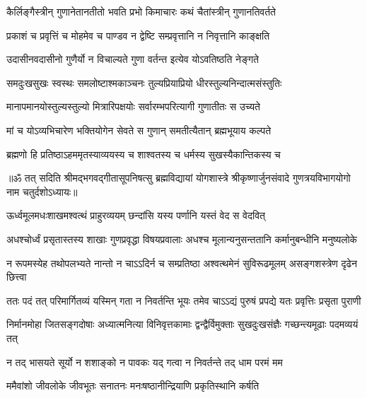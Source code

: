 
\twolineshloka
{कैर्लिङ्गैस्त्रीन् गुणानेतानतीतो भवति प्रभो}
{किमाचारः कथं चैतांस्त्रीन् गुणानतिवर्तते}%


\twolineshloka
{प्रकाशं च प्रवृत्तिं च मोहमेव च पाण्डव}
{न द्वेष्टि सम्प्रवृत्तानि न निवृत्तानि काङ्क्षति}%

\twolineshloka
{उदासीनवदासीनो गुणैर्यो न विचाल्यते}
{गुणा वर्तन्त इत्येव योऽवतिष्ठति नेङ्गते}%

\twolineshloka
{समदुःखसुखः स्वस्थः समलोष्टाश्मकाञ्चनः}
{तुल्यप्रियाप्रियो धीरस्तुल्यनिन्दात्मसंस्तुतिः}%

\twolineshloka
{मानापमानयोस्तुल्यस्तुल्यो मित्रारिपक्षयोः}
{सर्वारम्भपरित्यागी गुणातीतः स उच्यते}%

\twolineshloka
{मां च योऽव्यभिचारेण भक्तियोगेन सेवते}
{स गुणान् समतीत्यैतान् ब्रह्मभूयाय कल्पते}%

\twolineshloka
{ब्रह्मणो हि प्रतिष्ठाऽहममृतस्याव्ययस्य च}
{शाश्वतस्य च धर्मस्य सुखस्यैकान्तिकस्य च}%

{॥ॐ तत् सदिति श्रीमद्भगवद्गीतासूपनिषत्सु ब्रह्मविद्यायां योगशास्त्रे श्रीकृष्णार्जुनसंवादे गुणत्रयविभागयोगो नाम चतुर्दशोऽध्यायः॥}



\twolineshloka
{ऊर्ध्वमूलमधःशाखमश्वत्थं प्राहुरव्ययम्}
{छन्दांसि यस्य पर्णानि यस्तं वेद स वेदवित्}%

\fourlineindentedshloka
{अधश्चोर्ध्वं प्रसृतास्तस्य शाखाः}
{गुणप्रवृद्धा विषयप्रवालाः}
{अधश्च मूलान्यनुसन्ततानि}
{कर्मानुबन्धीनि मनुष्यलोके}%

\fourlineindentedshloka
{न रूपमस्येह तथोपलभ्यते}
{नान्तो न चाऽऽदिर्न च सम्प्रतिष्ठा}
{अश्वत्थमेनं सुविरूढमूलम्}
{असङ्गशस्त्रेण दृढेन छित्त्वा}%

\fourlineindentedshloka
{ततः पदं तत् परिमार्गितव्यं}
{यस्मिन् गता न निवर्तन्ति भूयः}
{तमेव चाऽऽद्यं पुरुषं प्रपद्ये}
{यतः प्रवृत्तिः प्रसृता पुराणी}%

\fourlineindentedshloka
{निर्मानमोहा जितसङ्गदोषाः}
{अध्यात्मनित्या विनिवृत्तकामाः}
{द्वन्द्वैर्विमुक्ताः सुखदुःखसंज्ञैः}
{गच्छन्त्यमूढाः पदमव्ययं तत्}%

\twolineshloka
{न तद् भासयते सूर्यो न शशाङ्को न पावकः}
{यद् गत्वा न निवर्तन्ते तद् धाम परमं मम}%

\twolineshloka
{ममैवांशो जीवलोके जीवभूतः सनातनः}
{मनःषष्ठानीन्द्रियाणि प्रकृतिस्थानि कर्षति}%

